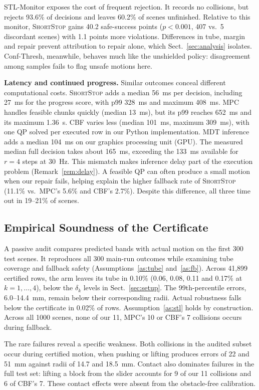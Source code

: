 \documentclass[runningheads]{llncs}
\newcommand{\sys}{\textsc{ShortStop}}
\begin{document}
STL-Monitor exposes the cost of frequent rejection. It records no
collisions, but rejects 93.6\% of decisions and leaves 60.2\% of scenes
unfinished. Relative to this monitor, \sys{} gains 40.2 safe-success
points ($p<0.001$, 407 vs.\ 5 discordant scenes) with 1.1 points more
violations. Differences in tube, margin and repair prevent attribution to repair
alone, which Sect.~\ref{sec:analysis} isolates. Conf-Thresh, meanwhile, behaves much like
the unshielded policy: disagreement among samples fails to flag unsafe motions here.

\textbf{Latency and continued progress.} Similar outcomes conceal different
computational costs. \sys{} adds a median 56~ms per decision, including
27~ms for the progress score, with p99 328~ms and maximum 408~ms.
MPC handles feasible chunks quickly (median 13~ms), but its p99 reaches
652~ms and its maximum 1.36~s. CBF varies less (median 101~ms, maximum
309~ms), with one QP solved per executed row in our Python implementation.
MDT inference adds a median 104~ms on our graphics processing unit (GPU).
The measured median full decision takes about 165~ms, exceeding the
133~ms available for $r=4$ steps at 30~Hz. This mismatch makes inference
delay part of the execution problem (Remark~\ref{rem:delay}).
A feasible QP can often produce a small motion when our repair fails,
helping explain the higher fallback rate of \sys{} (11.1\% vs.\ MPC's
5.6\% and CBF's 2.7\%). Despite this difference, all three time out in
19--21\% of scenes.

\subsection{Empirical Soundness of the Certificate}\label{sec:soundness}
A passive audit compares predicted bands with actual motion on the first
300 test scenes. It reproduces all 300 main-run outcomes while examining
tube coverage and fallback safety
(Assumptions~\ref{as:tube} and~\ref{as:fb}). Across 41{,}899 certified
rows, the arm leaves its tube in 0.10\%
(0.06, 0.08, 0.11 and 0.17\% at $k=1,\dots,4$), below the $\delta_k$ levels
in Sect.~\ref{sec:setup}. The 99th-percentile errors, 6.0--14.4~mm, remain
below their corresponding radii. Actual robustness falls below the
certificate in 0.02\% of rows. Assumption~\ref{as:stl} holds by construction.
Across all 1000 scenes, none of our 11, MPC's 10 or CBF's 7 collisions
occurs during fallback.

The rare failures reveal a specific weakness. Both collisions in the
audited subset occur during certified motion, when pushing or lifting
produces errors of 22 and 51~mm against radii of 14.7 and 18.5~mm.
Contact also dominates failures in the full test set: lifting a block
from the slider accounts for 9 of our 11 collisions and 6 of CBF's 7.
These contact effects were absent from the obstacle-free calibration.
\end{document}
